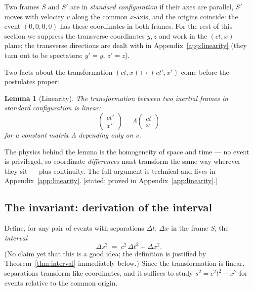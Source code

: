 \documentclass[11pt]{article}
\theoremstyle{plain}
\newtheorem{lemma}[theorem]{Lemma}
\theoremstyle{definition}
\theoremstyle{remark}
\begin{document}
Two frames $S$ and $S'$ are in \emph{standard configuration} if their
axes are parallel, $S'$ moves with velocity $v$ along the common
$x$-axis, and the origins coincide: the event $(0,0,0,0)$ has these
coordinates in both frames. For the rest of this section we suppress the
transverse coordinates $y, z$ and work in the $(ct, x)$ plane; the
transverse directions are dealt with in Appendix~\ref{app:linearity}
(they turn out to be spectators: $y' = y$, $z' = z$).

Two facts about the transformation
$(ct, x) \mapsto (ct', x')$ come before the postulates proper:

\begin{lemma}[Linearity]\label{lem:linearity}
The transformation between two inertial frames in standard configuration
is linear:
\begin{equation}
  \begin{pmatrix} ct' \\ x' \end{pmatrix}
  = \mathsf{\Lambda}
  \begin{pmatrix} ct \\ x \end{pmatrix}
\end{equation}
for a constant matrix $\mathsf{\Lambda}$ depending only on $v$.
\end{lemma}

\noindent
The physics behind the lemma is the homogeneity of space and time ---
no event is privileged, so coordinate \emph{differences} must transform
the same way wherever they sit --- plus continuity. The full argument is
technical and lives in Appendix~\ref{app:linearity}. [stated; proved in
Appendix~\ref{app:linearity}.]

\subsection{The invariant: derivation of the interval}
\label{sec:interval}

Define, for any pair of events with separations $\Delta t$, $\Delta x$ in
the frame $S$, the \emph{interval}
\begin{equation}
  \Delta s^2 \;=\; c^2\,\Delta t^2 - \Delta x^2 .
  \label{eq:interval-def}
\end{equation}
(No claim yet that this is a good idea; the definition is justified by
Theorem~\ref{thm:interval} immediately below.) Since the transformation is linear,
separations transform like coordinates, and it suffices to study
$s^2 = c^2t^2 - x^2$ for events relative to the common origin.
\end{document}
